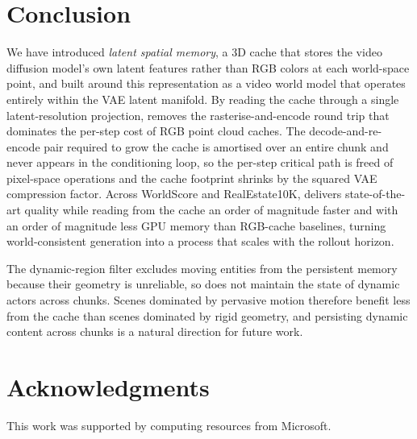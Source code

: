 \section{Conclusion}
\label{sec:conclusion}

We have introduced \emph{latent spatial memory}, a 3D cache that stores the video diffusion model's own latent features rather than RGB colors at each world-space point, and built \method{} around this representation as a video world model that operates entirely within the VAE latent manifold.
By reading the cache through a single latent-resolution projection, \method{} removes the rasterise-and-encode round trip that dominates the per-step cost of RGB point cloud caches.
The decode-and-re-encode pair required to grow the cache is amortised over an entire chunk and never appears in the conditioning loop, so the per-step critical path is freed of pixel-space operations and the cache footprint shrinks by the squared VAE compression factor.
Across WorldScore and RealEstate10K, \method{} delivers state-of-the-art quality while reading from the cache an order of magnitude faster and with an order of magnitude less GPU memory than RGB-cache baselines, turning world-consistent generation into a process that scales with the rollout horizon.

The dynamic-region filter excludes moving entities from the persistent memory because their geometry is unreliable, so \method{} does not maintain the state of dynamic actors across chunks.
Scenes dominated by pervasive motion therefore benefit less from the cache than scenes dominated by rigid geometry, and persisting dynamic content across chunks is a natural direction for future work.
\vspace{1cm}

\section{Acknowledgments}
This work was supported by computing resources from Microsoft.